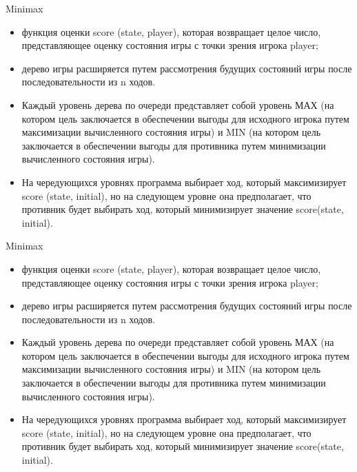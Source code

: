 \documentclass{beamer}
\begin{document}
\begin{frame}{Minimax}
\begin{itemize}
\item функция оценки score (state, player), которая возвращает
целое число, представляющее оценку состояния игры с точки зрения игрока player;
\item дерево игры расширяется путем рассмотрения будущих состояний игры после
последовательности из n ходов. 
\item Каждый уровень дерева по очереди представляет собой уровень МАХ (на котором цель заключается в обеспечении выгоды для исходного игрока путем максимизации вычисленного состояния игры) и MIN (на котором цель заключается в обеспечении выгоды для противника путем минимизации вычисленного состояния игры). 
\item На чередующихся уровнях программа выбирает ход, который максимизирует score (state, initial), но на следующем уровне она
предполагает, что противник будет выбирать ход, который минимизирует значение
score(state, initial).
\end{itemize}
\end{frame}

\begin{frame}{Minimax}
\begin{itemize}
\item функция оценки score (state, player), которая возвращает
целое число, представляющее оценку состояния игры с точки зрения игрока player;
\item дерево игры расширяется путем рассмотрения будущих состояний игры после
последовательности из n ходов. 
\item Каждый уровень дерева по очереди представляет собой уровень МАХ (на котором цель заключается в обеспечении выгоды для исходного игрока путем максимизации вычисленного состояния игры) и MIN (на котором цель заключается в обеспечении выгоды для противника путем минимизации вычисленного состояния игры). 
\item На чередующихся уровнях программа выбирает ход, который максимизирует score (state, initial), но на следующем уровне она
предполагает, что противник будет выбирать ход, который минимизирует значение
score(state, initial).
\end{itemize}
\end{frame}
\end{document}
